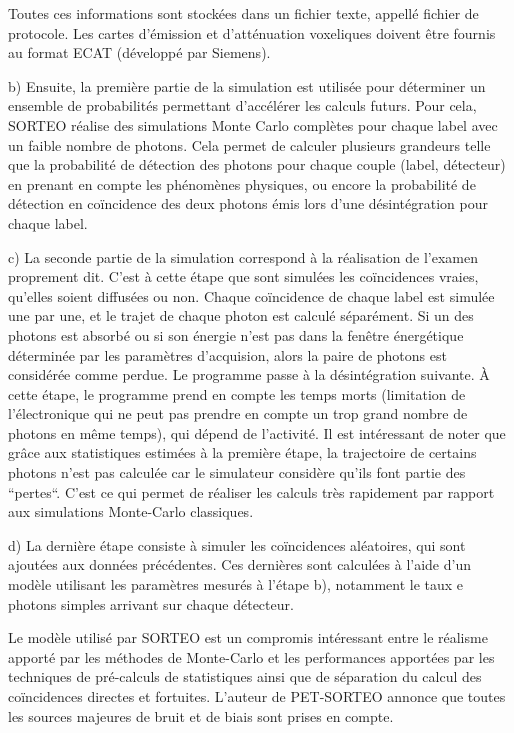 Toutes ces informations sont stockées dans un fichier texte, appellé fichier de protocole. Les cartes d'émission et d'atténuation voxeliques doivent être fournis au format ECAT (développé par Siemens).

b) Ensuite, la première partie de la simulation est utilisée pour déterminer un ensemble de probabilités permettant d'accélérer les calculs futurs. Pour cela, SORTEO réalise des simulations Monte Carlo complètes pour chaque label avec un faible nombre de photons. Cela permet de calculer plusieurs grandeurs telle que la probabilité de détection des photons pour chaque couple (label, détecteur) en prenant en compte les phénomènes physiques, ou encore la probabilité de détection en coïncidence des deux photons émis lors d'une désintégration pour chaque label.

c) La seconde partie de la simulation correspond à la réalisation de l'examen proprement dit. C'est à cette étape que sont simulées les coïncidences vraies, qu'elles soient diffusées ou non. Chaque coïncidence de chaque label est simulée une par une, et le trajet de chaque photon est calculé séparément. Si un des photons est absorbé ou si son énergie n'est pas dans la fenêtre énergétique déterminée par les paramètres d'acquision, alors la paire de photons est considérée comme perdue. Le programme passe à la désintégration suivante. \`A cette étape, le programme prend en compte les temps morts (limitation de l'électronique qui ne peut pas prendre en compte un trop grand nombre de photons en même temps), qui dépend de l'activité. Il est intéressant de noter que grâce aux statistiques estimées à la première étape, la trajectoire de certains photons n'est pas calculée car le simulateur considère qu'ils font partie des ``pertes``. C'est ce qui permet de réaliser les calculs très rapidement par rapport aux simulations Monte-Carlo classiques.

d) La dernière étape consiste à simuler les coïncidences aléatoires, qui sont ajoutées aux données précédentes. Ces dernières sont calculées à l'aide d'un modèle utilisant les paramètres mesurés à l'étape b), notamment le taux e photons simples arrivant sur chaque détecteur.


Le modèle utilisé par SORTEO est un compromis intéressant entre le réalisme apporté par les méthodes de Monte-Carlo et les performances apportées par les techniques de pré-calculs de statistiques ainsi que de séparation du calcul des coïncidences directes et fortuites. L'auteur de PET-SORTEO annonce que toutes les sources majeures de bruit et de biais sont prises en compte.

